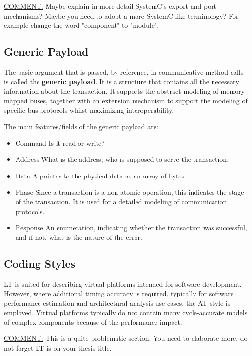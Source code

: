\documentclass[12pt,twoside]{article}
\begin{document}
\uline{COMMENT:} Maybe explain in more detail SystemC's export and port mechanisms?
Maybe you need to adopt a more SystemC like terminology? For example change the word "component" to "module".


\subsection{Generic Payload}
\label{sec-6-3}
The basic argument that is passed, by reference, in communicative method calls is called the \textbf{generic payload}.
It is a structure that contains all the necessary information about the transaction.
It supports the abstract modeling of memory-mapped buses, together with an extension mechanism to support the modeling of specific bus protocols whilst maximizing interoperability.

The main features/fields of the generic payload are:
\begin{itemize}
\item Command 
Is it read or write?
\item Address
What is the address, who is supposed to serve the transaction.
\item Data
A pointer to the physical data as an array of bytes.
\item Phase
Since a transaction is a non-atomic operation, this indicates the stage of the transaction. It is used for a detailed modeling of communication protocols.
\item Response
An enumeration, indicating whether the transaction was successful, and if not, what is the nature of the error.
\end{itemize}




\subsection{Coding Styles}
\label{sec-6-4}
LT is suited for describing virtual platforms intended for software development.
However, where additional timing accuracy is required, typically for software performance estimation and architectural analysis use cases, the AT style is employed.
Virtual platforms typically do not contain many cycle-accurate models of complex components because of the performance impact. 

\uline{COMMENT:} This is a quite problematic section. You need to elaborate more, do not forget LT is on your thesis title. 
\end{document}
